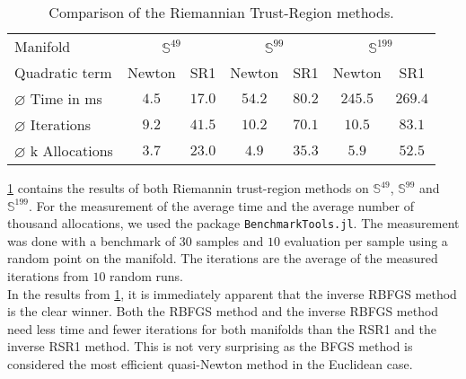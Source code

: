 \begin{table}[H]\label{tab:Results}
    \center
        \begin{tabular}{lcccccc}
            \toprule
            Manifold & \multicolumn{2}{c}{$\mathbb{S}^{49}$}& \multicolumn{2}{c}{$\mathbb{S}^{99}$} & \multicolumn{2}{c}{$\mathbb{S}^{199}$}\\ 
            \cmidrule(lr){2-3} \cmidrule(lr){4-5} \cmidrule(lr){6-7}
            Quadratic term & Newton & SR1 & Newton & SR1 & Newton & SR1 \\ 

            $\varnothing$ Time in ms & $4.5$ & $17.0$ & $54.2$ & $80.2$ & $245.5$ & $269.4$\\ 
            $\varnothing$ Iterations & $9.2$ & $41.5$ & $10.2$ & $70.1$ & $10.5$ & $83.1$ \\
            $\varnothing$ k Allocations& $3.7$ & $23.0$ & $4.9$ & $35.3$ & $5.9$ & $52.5$ \\
            \bottomrule
        \end{tabular}
    \caption{Comparison of the Riemannian Trust-Region methods.}
\end{table}
\cref{tab:Results} contains the results of both Riemannin trust-region methods on $\mathbb{S}^{49}$, $\mathbb{S}^{99}$ and $\mathbb{S}^{199}$. For the measurement of the average time and the average number of thousand allocations, we used the package \lstinline!BenchmarkTools.jl!. The measurement was done with a benchmark of $30$ samples and $10$ evaluation per sample using a random point on the manifold. The iterations are the average of the measured iterations from $10$ random runs. \\

In the results from \cref{tab:Results}, it is immediately apparent that the inverse RBFGS method is the clear winner. Both the RBFGS method and the inverse RBFGS method need less time and fewer iterations for both manifolds than the RSR1 and the inverse RSR1 method. This is not very surprising as the BFGS method is considered the most efficient quasi-Newton method in the Euclidean case. \\




